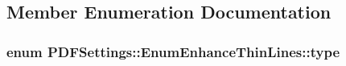 \subsection{Member Enumeration Documentation}
\hypertarget{classPDFSettings_1_1EnumEnhanceThinLines_a654750972bfae3ed1f24a3c7a26f48d8}{
\subsubsection[{type}]{\setlength{\rightskip}{0pt plus 5cm}enum {\bf P\+D\+F\+Settings\+::\+Enum\+Enhance\+Thin\+Lines\+::type}}}\label{classPDFSettings_1_1EnumEnhanceThinLines_a654750972bfae3ed1f24a3c7a26f48d8}
